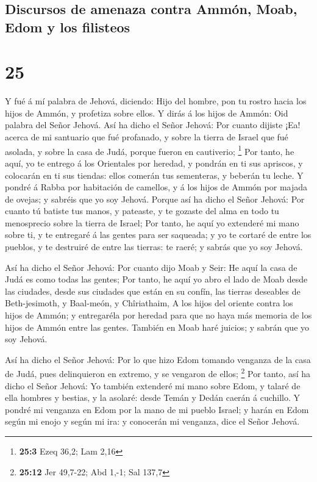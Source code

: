 \hypertarget{discursos-de-amenaza-contra-ammuxf3n-moab-edom-y-los-filisteos}{%
\subsection{Discursos de amenaza contra Ammón, Moab, Edom y los
filisteos}\label{discursos-de-amenaza-contra-ammuxf3n-moab-edom-y-los-filisteos}}

\hypertarget{section-24}{%
\section{25}\label{section-24}}

 Y fué á mí palabra de Jehová, diciendo:  Hijo
del hombre, pon tu rostro hacia los hijos de Ammón, y profetiza sobre
ellos.  Y dirás á los hijos de Ammón: Oid palabra del Señor
Jehová. Así ha dicho el Señor Jehová: Por cuanto dijiste ¡Ea! acerca de
mi santuario que fué profanado, y sobre la tierra de Israel que fué
asolada, y sobre la casa de Judá, porque fueron en cautiverio;
\footnote{\textbf{25:3} Ezeq 36,2; Lam 2,16}  Por tanto, he
aquí, yo te entrego á los Orientales por heredad, y pondrán en ti sus
apriscos, y colocarán en ti sus tiendas: ellos comerán tus sementeras, y
beberán tu leche.  Y pondré á Rabba por habitación de
camellos, y á los hijos de Ammón por majada de ovejas; y sabréis que yo
soy Jehová.  Porque así ha dicho el Señor Jehová: Por cuanto
tú batiste tus manos, y pateaste, y te gozaste del alma en todo tu
menosprecio sobre la tierra de Israel;  Por tanto, he aquí
yo extenderé mi mano sobre ti, y te entregaré á las gentes para ser
saqueada; y yo te cortaré de entre los pueblos, y te destruiré de entre
las tierras: te raeré; y sabrás que yo soy Jehová.

 Así ha dicho el Señor Jehová: Por cuanto dijo Moab y Seir:
He aquí la casa de Judá es como todas las gentes;  Por
tanto, he aquí yo abro el lado de Moab desde las ciudades, desde sus
ciudades que están en su confín, las tierras deseables de Beth-jesimoth,
y Baal-meón, y Chîriathaim,  A los hijos del oriente contra
los hijos de Ammón; y entregaréla por heredad para que no haya más
memoria de los hijos de Ammón entre las gentes.  También en
Moab haré juicios; y sabrán que yo soy Jehová.

 Así ha dicho el Señor Jehová: Por lo que hizo Edom tomando
venganza de la casa de Judá, pues delinquieron en extremo, y se vengaron
de ellos; \footnote{\textbf{25:12} Jer 49,7-22; Abd 1,-1; Sal 137,7}
 Por tanto, así ha dicho el Señor Jehová: Yo también
extenderé mi mano sobre Edom, y talaré de ella hombres y bestias, y la
asolaré: desde Temán y Dedán caerán á cuchillo.  Y pondré
mi venganza en Edom por la mano de mi pueblo Israel; y harán en Edom
según mi enojo y según mi ira: y conocerán mi venganza, dice el Señor
Jehová.

